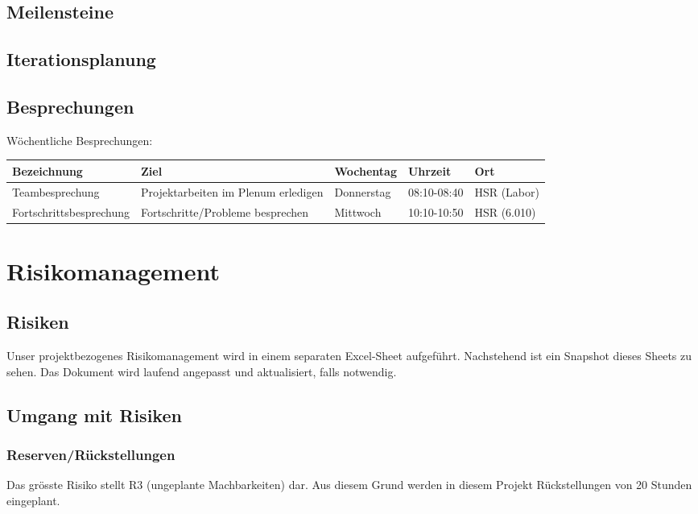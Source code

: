 \subsection*{Meilensteine}
\tbd

\subsection*{Iterationsplanung}
\tbd

\subsection*{Besprechungen}
Wöchentliche Besprechungen: \\

\begin{tabularx}{\textwidth}{lXlll}
	\textbf{Bezeichnung}	& \textbf{Ziel} & \textbf{Wochentag} & \textbf{Uhrzeit} & \textbf{Ort}\\
	\hline
	Teambesprechung			& Projektarbeiten im Plenum erledigen	& Donnerstag & 08:10-08:40	& HSR (Labor) \\ \hline
	Fortschrittsbesprechung	& Fortschritte/Probleme besprechen		& Mittwoch & 10:10-10:50	& HSR (6.010) \\ \hline
\end{tabularx}
\pagebreak

\section*{Risikomanagement}
\subsection*{Risiken}
Unser projektbezogenes Risikomanagement wird in einem separaten Excel-Sheet aufgeführt. Nachstehend ist ein Snapshot dieses Sheets zu sehen. Das Dokument wird laufend angepasst und aktualisiert, falls notwendig. \tbd

\subsection*{Umgang mit Risiken}
\subsubsection*{Reserven/Rückstellungen}
Das grösste Risiko stellt R3 (ungeplante Machbarkeiten) \tbd dar. Aus diesem Grund werden in diesem Projekt Rückstellungen von 20 Stunden eingeplant.

